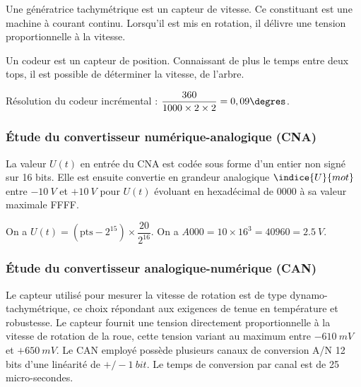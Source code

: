 

\ifprof
\begin{corrige}
Une génératrice tachymétrique est un capteur de vitesse. Ce constituant est une machine à courant continu. Lorsqu'il est mis en rotation, il délivre une tension proportionnelle à la vitesse. 
\end{corrige}
\else
\fi

\ifprof
\begin{corrige}
Un codeur est un capteur de position. Connaissant de plus le temps entre deux tops, il est possible de déterminer la vitesse, de l'arbre.

Résolution du codeur incrémental : $\dfrac{360}{1000\times 2 \times 2} = 0,09 \degres$.
\end{corrige}
\else
\fi


\subsubsection{Étude du convertisseur numérique-analogique (CNA)}
\ifprof\else
La valeur $U (t)$ en entrée du CNA est codée sous forme d'un entier non signé sur 16 bits. Elle est
ensuite convertie en grandeur analogique $\indice{U}{mot}$ entre $-\SI{10}{V}$ et $+\SI{10}{V}$ pour $U (t)$ évoluant en hexadécimal de 0000 à sa valeur maximale FFFF.
\fi
\ifprof
\begin{corrige}
On a $U(t) = \left(\text{pts}-2^{15}\right) \times \dfrac{20}{2^{16}}$.
On a $A000 = 10\times 16^3 = 40960 = \SI{2,5}{V}$.  
\end{corrige}
\else
\fi

\subsubsection{Étude du convertisseur analogique-numérique (CAN)}
\ifprof\else
Le capteur utilisé pour mesurer la vitesse de rotation est de type dynamo-tachymétrique, ce choix
répondant aux exigences de tenue en température et robustesse. Le capteur fournit une tension
directement proportionnelle à la vitesse de rotation de la roue, cette tension variant au maximum
entre $-\SI{610}{mV}$ et $+\SI{650}{mV}$. Le CAN employé possède plusieurs canaux de conversion A/N 12 bits
d'une linéarité de $+/-\SI{1}{bit}$. Le temps de conversion par canal est de 25 micro-secondes.
\fi

